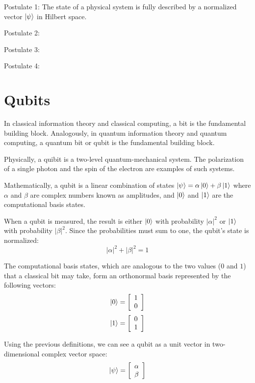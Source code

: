 
Postulate 1: The state of a physical system is fully described by a normalized vector $\left|{\psi}\right\rangle$ in Hilbert space.

Postulate 2:

Postulate 3:
 
Postulate 4:


\section{Qubits}

In classical information theory and classical computing, a bit is the fundamental building block.
Analogously, in quantum information theory and quantum computing, a quantum bit or qubit is the fundamental building block.

Physically, a quibit is a two-level quantum-mechanical system. The polarization of a single photon and the spin of the electron are examples of such systems.

Mathematically, a qubit is a linear combination of states $\left|{\psi}\right\rangle=\alpha\left|{0}\right\rangle+\beta\left|{1}\right\rangle$ where $\alpha$ and $\beta$ are complex numbers known as amplitudes, and $\left|{0}\right\rangle$ and $\left|{1}\right\rangle$ are the computational basis states.

When a qubit is measured, the result is either $\left|{0}\right\rangle$ with probability $|\alpha|^2$ or $\left|{1}\right\rangle$ with probability $|\beta|^2$.
Since the probabilities must sum to one, the qubit's state is normalized:
$$|\alpha|^2+|\beta|^2=1$$

The computational basis states, which are analogous to the two values ($0$ and $1$) that a classical bit may take, form an orthonormal basis represented by the following vectors:
$$\left|{0}\right\rangle=\left[\begin{array}{c}1 \\ 0\end{array}\right]$$
$$\left|{1}\right\rangle=\left[\begin{array}{c}0 \\ 1\end{array}\right]$$

Using the previous definitions, we can see a qubit as a unit vector in two-dimensional complex vector space:
\[\left|{\psi}\right\rangle=\left[\begin{array}{c}\alpha \\ \beta\end{array}\right]\]

